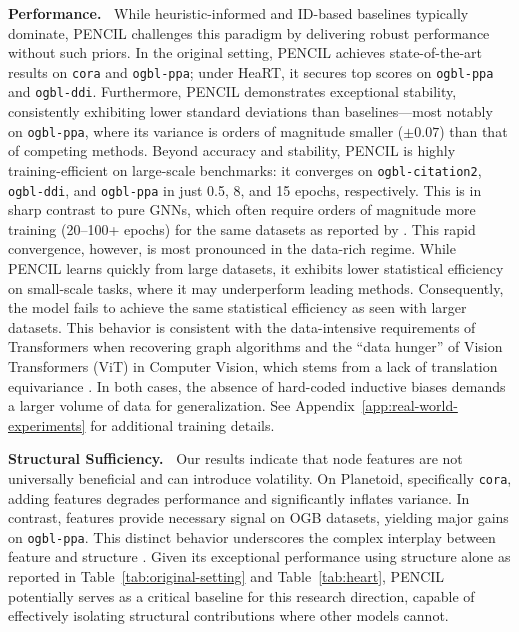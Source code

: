 \documentclass{article}
\theoremstyle{plain}
\theoremstyle{definition}
\theoremstyle{remark}
\begin{document}
\textbf{Performance.~} While heuristic-informed and ID-based baselines typically dominate, PENCIL challenges this paradigm by delivering robust performance without such priors. In the original setting, PENCIL achieves state-of-the-art results on \texttt{cora} and \texttt{ogbl-ppa}; under HeaRT, it secures top scores on \texttt{ogbl-ppa} and \texttt{ogbl-ddi}. Furthermore, PENCIL demonstrates exceptional stability, consistently exhibiting lower standard deviations than baselines---most notably on \texttt{ogbl-ppa}, where its variance is orders of magnitude smaller ($\pm 0.07$) than that of competing methods. Beyond accuracy and stability, PENCIL is highly training-efficient on large-scale benchmarks: it converges on \texttt{ogbl-citation2}, \texttt{ogbl-ddi}, and \texttt{ogbl-ppa} in just 0.5, 8, and 15 epochs, respectively. This is in sharp contrast to pure GNNs, which often require orders of magnitude more training (20--100+ epochs) for the same datasets as reported by \cite{li_evaluating_2023}. This rapid convergence, however, is most pronounced in the data-rich regime. While PENCIL learns quickly from large datasets, it exhibits lower statistical efficiency on small-scale tasks, where it may underperform leading methods. Consequently, the model fails to achieve the same statistical efficiency as seen with larger datasets. This behavior is consistent with the data-intensive requirements of Transformers when recovering graph algorithms \cite{sanford_understanding_2024} and the ``data hunger'' of Vision Transformers (ViT) in Computer Vision, which stems from a lack of translation equivariance \cite{dosovitskiy2021an}. In both cases, the absence of hard-coded inductive biases demands a larger volume of data for generalization. See Appendix~\ref{app:real-world-experiments} for additional training details.

\textbf{Structural Sufficiency.~} Our results indicate that node features are not universally beneficial and can introduce volatility. On Planetoid, specifically \texttt{cora}, adding features degrades performance and significantly inflates variance. In contrast, features provide necessary signal on OGB datasets, yielding major gains on \texttt{ogbl-ppa}. This distinct behavior underscores the complex interplay between feature and structure \cite{coupette2025no,castellana2023investigatinginterplayfeaturesstructures}. Given its exceptional performance using structure alone as reported in Table~\ref{tab:original-setting} and Table~\ref{tab:heart}, PENCIL potentially serves as a critical baseline for this research direction, capable of effectively isolating structural contributions where other models cannot.
\end{document}

